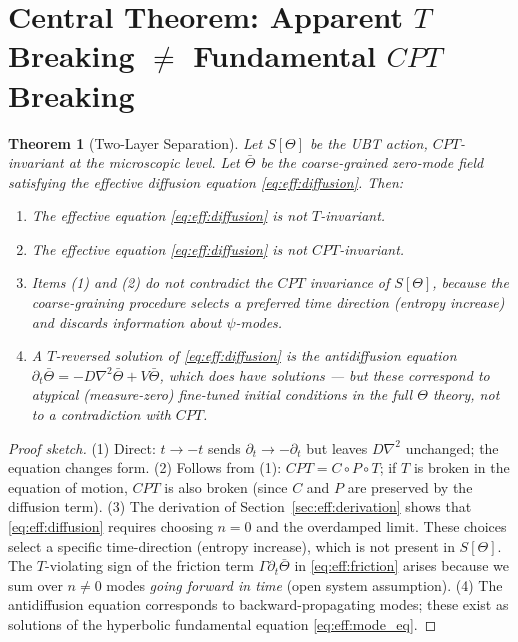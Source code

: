 \documentclass[12pt,a4paper]{article}
\newtheorem{theorem}{Theorem}[section]
\theoremstyle{definition}
\theoremstyle{remark}
\begin{document}
\section{Central Theorem: Apparent $T$ Breaking $\neq$ Fundamental $CPT$ Breaking}
\label{sec:eff:theorem}

\begin{theorem}[Two-Layer Separation]
\label{thm:eff:separation}
Let $S[\Theta]$ be the UBT action, $CPT$-invariant at the microscopic level.
Let $\bar\Theta$ be the coarse-grained zero-mode field satisfying the effective
diffusion equation \eqref{eq:eff:diffusion}.
Then:
\begin{enumerate}
  \item The effective equation \eqref{eq:eff:diffusion} is not $T$-invariant.
  \item The effective equation \eqref{eq:eff:diffusion} is not $CPT$-invariant.
  \item Items (1) and (2) do not contradict the $CPT$ invariance of $S[\Theta]$,
    because the coarse-graining procedure selects a preferred time direction
    (entropy increase) and discards information about $\psi$-modes.
  \item A $T$-reversed solution of \eqref{eq:eff:diffusion} is the \emph{antidiffusion}
    equation $\partial_t\bar\Theta = -D\nabla^2\bar\Theta + V\bar\Theta$,
    which does have solutions — but these correspond to atypical (measure-zero)
    fine-tuned initial conditions in the full $\Theta$ theory, not to a
    contradiction with $CPT$.
\end{enumerate}
\end{theorem}

\begin{proof}[Proof sketch]
(1) Direct: $t\to-t$ sends $\partial_t\to-\partial_t$ but leaves $D\nabla^2$
unchanged; the equation changes form.
(2) Follows from (1): $CPT=C\circ P\circ T$; if $T$ is broken in the equation
of motion, $CPT$ is also broken (since $C$ and $P$ are preserved by the
diffusion term).
(3) The derivation of Section~\ref{sec:eff:derivation} shows that
\eqref{eq:eff:diffusion} requires choosing $n=0$ and the overdamped limit.
These choices select a specific time-direction (entropy increase), which is
not present in $S[\Theta]$.  The $T$-violating sign of the friction term
$\Gamma\partial_t\bar\Theta$ in \eqref{eq:eff:friction} arises because
we sum over $n\neq0$ modes \emph{going forward in time} (open system assumption).
(4) The antidiffusion equation corresponds to backward-propagating modes;
these exist as solutions of the hyperbolic fundamental equation
\eqref{eq:eff:mode_eq}.
\end{proof}
\end{document}
